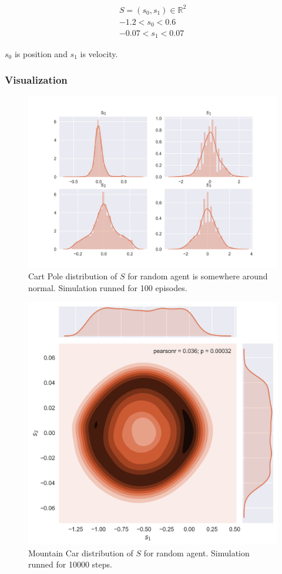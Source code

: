\documentclass[12pt]{article}
\begin{document}
\begin{multline*}
 S = (s_0, s_1) \in \mathbb{R}^2 \\
-1.2 < s_0 < 0.6 \\
-0.07 < s_1 < 0.07
\end{multline*}

$s_0$ is position and $s_1$ is velocity.

\subsubsection{Visualization}

\begin{figure}[h]
\includegraphics[width=\textwidth]{exploratory_cartpole.png} 
\centering
\caption{Cart Pole distribution of $S$ for random agent is somewhere around normal. Simulation runned for 100 episodes.}
\end{figure}

\begin{figure}[h]
\includegraphics[width=\textwidth]{exploratory_mountaincar.png} 
\centering
\caption{Mountain Car distribution of $S$ for random agent. Simulation runned for 10000 steps.}
\end{figure}
\end{document}
